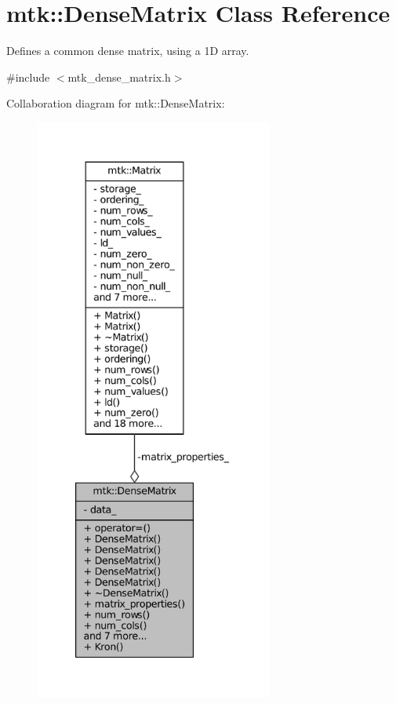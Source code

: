 \hypertarget{classmtk_1_1DenseMatrix}{\section{mtk\-:\-:Dense\-Matrix Class Reference}
\label{classmtk_1_1DenseMatrix}
}


Defines a common dense matrix, using a 1\-D array.  




{\ttfamily \#include $<$mtk\-\_\-dense\-\_\-matrix.\-h$>$}



Collaboration diagram for mtk\-:\-:Dense\-Matrix\-:\nopagebreak
\begin{figure}[H]
\begin{center}
\leavevmode
\includegraphics[height=550pt]{classmtk_1_1DenseMatrix__coll__graph}
\end{center}
\end{figure}

